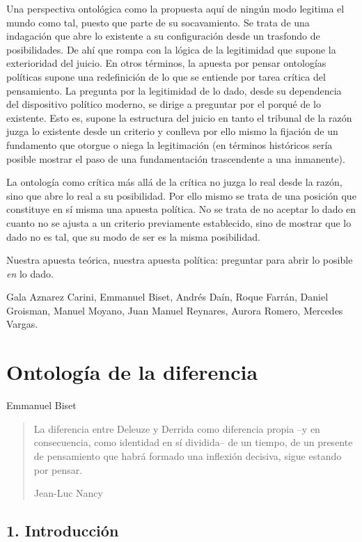 Una perspectiva ontológica como la propuesta aquí de ningún modo legitima el mundo como tal, puesto que parte de su socavamiento. Se trata de una indagación que abre lo existente a su configuración desde un trasfondo de posibilidades. De ahí que rompa con la lógica de la legitimidad que supone la exterioridad del juicio. En otros términos, la apuesta por pensar ontologías políticas supone una redefinición de lo que se entiende por tarea crítica del pensamiento. La pregunta por la legitimidad de lo dado, desde su dependencia del dispositivo político moderno, se dirige a preguntar por el porqué de lo existente. Esto es, supone la estructura del juicio en tanto el tribunal de la razón juzga lo existente desde un criterio y conlleva por ello mismo la fijación de un fundamento que otorgue o niega la legitimación (en términos históricos sería posible mostrar el paso de una fundamentación trascendente a una inmanente).

La ontología como crítica más allá de la crítica no juzga lo real desde la razón, sino que abre lo real a su posibilidad. Por ello mismo se trata de una posición que constituye en sí misma una apuesta política. No se trata de no aceptar lo dado en cuanto no se ajusta a un criterio previamente establecido, sino de mostrar que lo dado no es tal, que su modo de ser es la misma posibilidad.

Nuestra apuesta teórica, nuestra apuesta política: preguntar para abrir lo posible \emph{en} lo dado.

Gala Aznarez Carini, Emmanuel Biset, Andrés Daín, Roque Farrán, Daniel Groisman, Manuel Moyano, Juan Manuel Reynares, Aurora Romero, Mercedes Vargas.

\chapter{Ontología de la diferencia}

Emmanuel Biset

\begin{quote}
La diferencia entre Deleuze y Derrida como diferencia propia --y en consecuencia, como identidad en sí dividida-- de un tiempo, de un presente de pensamiento que habrá formado una inflexión decisiva, sigue estando por pensar.

Jean-Luc Nancy
\end{quote}

\section{1. Introducción}

